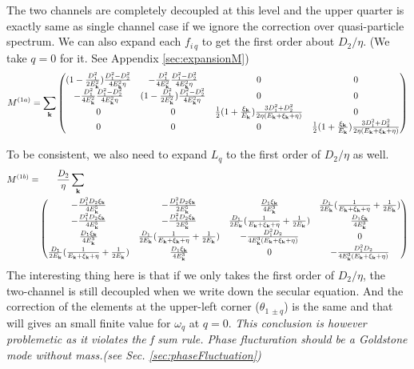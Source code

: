 The two channels are completely decoupled at this level and the upper quarter is exactly same as single channel case if we ignore the correction over quasi-particle spectrum.   We can also expand each $f_{i\,q}$ to get the first order about $D_{2}/\eta$. (We take $q=0$ for it. See Appendix \ref{sec:expansionM})
\begin{equation}
M^{(1a)}=\sum_{\mathbf{k}}
\begin{pmatrix}
(1-\frac{D_{1}^{2}}{2E_{\mathbf{k}}^{2}})\frac{D_{1}^{2}-D_{2}^{2}}{4E_{\mathbf{k}}^{2}\eta}
&-\frac{D_{1}^{2}}{4E_{\mathbf{k}}^{2}}\frac{D_{1}^{2}-D_{2}^{2}}{4E_{\mathbf{k}}^{2}\eta}&0&0\\
-\frac{D_{1}^{2}}{4E_{\mathbf{k}}^{2}}\frac{D_{1}^{2}-D_{2}^{2}}{4E_{\mathbf{k}}^{2}\eta}
&(1-\frac{D_{1}^{2}}{2E_{\mathbf{k}}^{2}})\frac{D_{1}^{2}-D_{2}^{2}}{4E_{\mathbf{k}}^{2}\eta}&0&0\\
0&0&\frac{1}{2}(1+\frac{\xi_{\mathbf{k}}}{E_{\mathbf{k}}})\frac{3D_{1}^{2}+D_{2}^{2}}{2\eta(E_{\mathbf{k}}+\xi_{\mathbf{k}}+\eta)}&0\\
0&0&0&\frac{1}{2}(1+\frac{\xi_{\mathbf{k}}}{E_{\mathbf{k}}})\frac{3D_{1}^{2}+D_{2}^{2}}{2\eta(E_{\mathbf{k}}+\xi_{\mathbf{k}}+\eta)}
\end{pmatrix}
\end{equation}

To be consistent, we also need to expand $L_{q}$ to the first order of  $D_{2}/\eta$ as well.  
\begin{equation}
\begin{split}
M^{(1b)}=&\qquad\frac{D_{2}}{\eta}\sum_{\mathbf{k}}\\
&\begin{pmatrix}
-\frac{D_{1}^{2}D_{2}\xi_{\mathbf{k}}}{4E^{5}_{\mathbf{k}}}&-\frac{D_{1}^{2}D_{2}\xi_{\mathbf{k}}}{2E^{5}_{\mathbf{k}}}
&\frac{D_{1}\xi_{\mathbf{k}}}{4E_{\mathbf{k}}^{3}}&\frac{D_{1}}{2E_{\mathbf{k}}}(\frac{1}{E_{\mathbf{k}}+\xi_{\mathbf{k}}+\eta}+\frac{1}{2E_{\mathbf{k}}})\\
-\frac{D_{1}^{2}D_{2}\xi_{\mathbf{k}}}{4E^{5}_{\mathbf{k}}}&-\frac{D_{1}^{2}D_{2}\xi_{\mathbf{k}}}{2E^{5}_{\mathbf{k}}}
&\frac{D_{1}}{2E_{\mathbf{k}}}(\frac{1}{E_{\mathbf{k}}+\xi_{\mathbf{k}}+\eta}+\frac{1}{2E_{\mathbf{k}}})&\frac{D_{1}\xi_{\mathbf{k}}}{4E_{\mathbf{k}}^{3}}\\
\frac{D_{1}\xi_{\mathbf{k}}}{4E_{\mathbf{k}}^{3}}&\frac{D_{1}}{2E_{\mathbf{k}}}(\frac{1}{E_{\mathbf{k}}+\xi_{\mathbf{k}}+\eta}+\frac{1}{2E_{\mathbf{k}}})
&-\frac{D_{1}^{2}D_{2}}{4E_{\mathbf{k}}^{3}(E_{\mathbf{k}}+\xi_{\mathbf{k}}+\eta)}&0\\
\frac{D_{1}}{2E_{\mathbf{k}}}(\frac{1}{E_{\mathbf{k}}+\xi_{\mathbf{k}}+\eta}+\frac{1}{2E_{\mathbf{k}}})&\frac{D_{1}\xi_{\mathbf{k}}}{4E_{\mathbf{k}}^{3}}
&0&-\frac{D_{1}^{2}D_{2}}{4E_{\mathbf{k}}^{3}(E_{\mathbf{k}}+\xi_{\mathbf{k}}+\eta)}\\
\end{pmatrix}
\end{split}
\end{equation}
The interesting thing here is that if we only takes the first order of $D_{2}/\eta$, the two-channel is still decoupled when we write down the secular equation.  And the correction of the elements at the upper-left corner ($\theta_{1\,\pm{q}}$) is the same and that will gives an small finite value for $\omega_{q}$ at $q=0$. \emph{This conclusion is however problemetic as it violates the f sum rule.  Phase flucturation should be a Goldstone mode without mass.(see Sec. \ref{sec:phaseFluctuation}) }